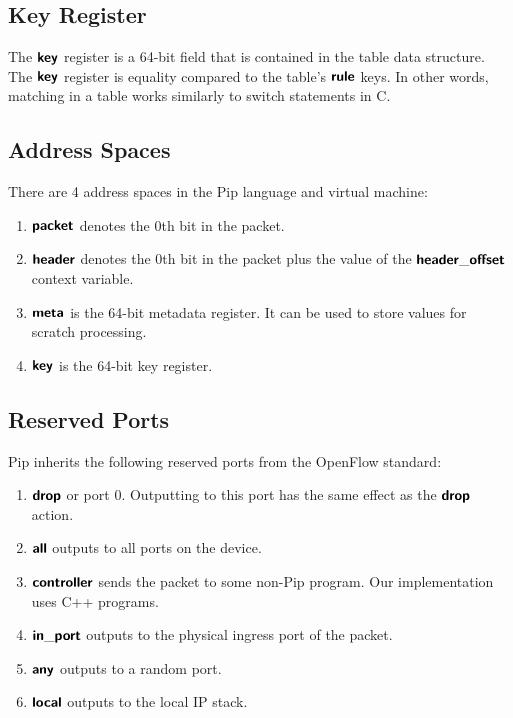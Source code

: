 \subsection{Key Register}
The $\bm{\mathsf{{key}}}$ register is a 64-bit field that is contained in the table data structure. The $\bm{\mathsf{{key}}}$ register is equality compared to the table's $\bm{\mathsf{{rule}}}$ keys. In other words, matching in a table works similarly to switch statements in C.

\subsection{Address Spaces}
There are 4 address spaces in the Pip language and virtual machine:
\begin{enumerate}
  \item $\bm{\mathsf{{packet}}}$ denotes the 0th bit in the packet.
  \item $\bm{\mathsf{{header}}}$ denotes the 0th bit in the packet plus the value of the $\bm{\mathsf{{header\_offset}}}$ context variable.
  \item $\bm{\mathsf{{meta}}}$ is the 64-bit metadata register. It can be used to store values for scratch processing.
  \item $\bm{\mathsf{{key}}}$ is the 64-bit key register.
\end{enumerate}

\subsection{Reserved Ports}
Pip inherits the following reserved ports from the OpenFlow standard:
\begin{enumerate}
  \item $\bm{\mathsf{{drop}}}$ or port 0. Outputting to this port has the same effect as the $\bm{\mathsf{{drop}}}$ action.
  \item $\bm{\mathsf{{all}}}$ outputs to all ports on the device.
  \item $\bm{\mathsf{{controller}}}$ sends the packet to some non-Pip program. Our implementation uses C++ programs.
  \item $\bm{\mathsf{{in\_port}}}$ outputs to the physical ingress port of the packet.
  \item $\bm{\mathsf{{any}}}$ outputs to a random port.
  \item $\bm{\mathsf{{local}}}$ outputs to the local IP stack.
\end{enumerate}

